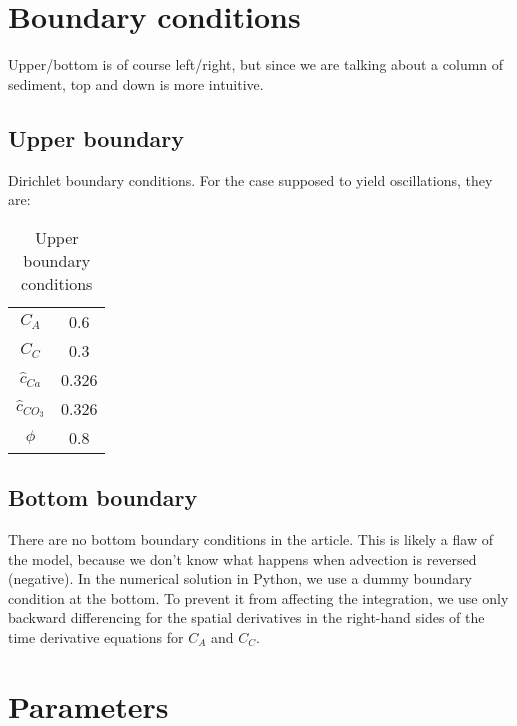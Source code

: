\documentclass[10pt, letterpaper]{article}
\begin{document}
\section{Boundary conditions}
Upper/bottom is of course left/right, but since we are talking about a column of sediment, top and down is more intuitive.

\subsection{Upper boundary}
Dirichlet boundary conditions. For the case supposed to yield oscillations, they are:

\begin{table}
    \centering
    \begin{tabular}{cc}
         $C_A$& 0.6\\
         $C_C$& 0.3\\
         $\hat{c}_{Ca}$& 0.326\\
         $\hat{c}_{CO_3}$& 0.326\\
         $\phi$& 0.8\\
    \end{tabular}
    \caption{Upper boundary conditions}
\end{table}
\subsection{Bottom boundary}
There are no bottom boundary conditions in the article. This is likely a flaw of the model, because we don't know what happens when advection is reversed (negative).
In the numerical solution in Python, we use a dummy boundary condition at the bottom. To prevent it from affecting the integration, we use only backward differencing for the spatial derivatives in the right-hand sides of the time derivative equations for $C_A$ and $C_C$.

\section{Parameters}
\end{document}
